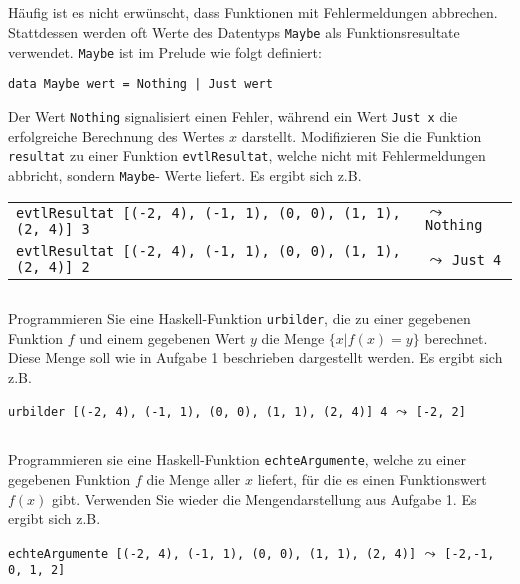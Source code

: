 \documentclass[
  10pt,                   %
  DIV12,
  german,                 %
  oneside,                %
  parskip=half,           %
  headings=normal,        %
  captions=tableheading,  %
]{scrartcl}
\begin{document}
\subsection{}
Häufig ist es nicht erwünscht, dass Funktionen mit Fehlermeldungen abbrechen.
Stattdessen werden oft Werte des Datentyps \lstinline|Maybe| als Funktionsresultate verwendet.
\lstinline|Maybe| ist im Prelude wie folgt definiert:
\begin{lstlisting}
data Maybe wert = Nothing | Just wert
\end{lstlisting}
Der Wert \lstinline|Nothing| signalisiert einen Fehler, während ein Wert \lstinline|Just x| die erfolgreiche
Berechnung des Wertes $x$ darstellt. Modifizieren Sie die Funktion \lstinline|resultat| zu einer
Funktion \lstinline|evtlResultat|, welche nicht mit Fehlermeldungen abbricht, sondern \lstinline|Maybe|-
Werte liefert. Es ergibt sich z.B.
\begin{center}
\begin{tabular}{ll}
\lstinline|evtlResultat [(-2, 4), (-1, 1), (0, 0), (1, 1), (2, 4)] 3| & $\leadsto$ \lstinline|Nothing|\\
\lstinline|evtlResultat [(-2, 4), (-1, 1), (0, 0), (1, 1), (2, 4)] 2| & $\leadsto$ \lstinline|Just 4|
\end{tabular}
\end{center}
\subsection{}
Programmieren Sie eine Haskell-Funktion \lstinline|urbilder|, die zu einer gegebenen Funktion
$f$ und einem gegebenen Wert $y$ die Menge $\{x | f(x) = y\}$ berechnet. Diese Menge
soll wie in Aufgabe 1 beschrieben dargestellt werden. Es ergibt sich z.B.
\begin{center}
\lstinline|urbilder [(-2, 4), (-1, 1), (0, 0), (1, 1), (2, 4)] 4| $\leadsto$ \lstinline|[-2, 2]| 
\end{center}
\subsection{}
Programmieren sie eine Haskell-Funktion \lstinline|echteArgumente|, welche zu einer gegebenen
Funktion $f$ die Menge aller $x$ liefert, für die es einen Funktionswert $f(x)$ gibt.
Verwenden Sie wieder die Mengendarstellung aus Aufgabe 1. Es ergibt sich z.B.
\begin{center}
\lstinline|echteArgumente [(-2, 4), (-1, 1), (0, 0), (1, 1), (2, 4)]| $\leadsto$ \lstinline|[-2,-1, 0, 1, 2]|
\end{center}
\end{document}
